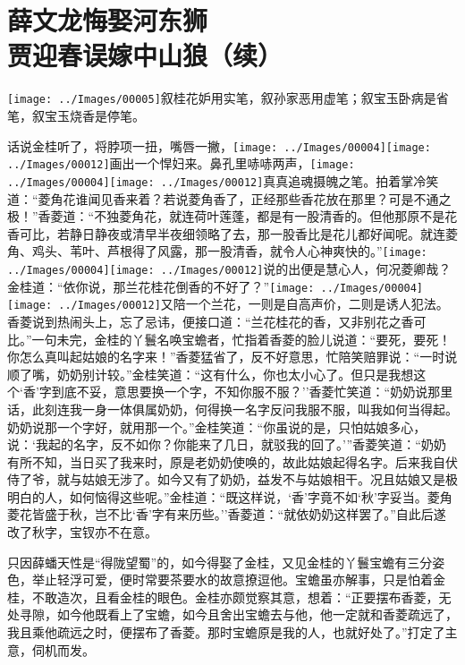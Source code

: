 
\chapter{薛文龙悔娶河东狮\\贾迎春误嫁中山狼（续）}

{\texttt{[image: ../Images/00005]}\kaishu 叙桂花妒用实笔，叙孙家恶用虚笔；叙宝玉卧病是省笔，叙宝玉烧香是停笔。}

话说金桂听了，将脖项一扭，嘴唇一撇，{\texttt{[image: ../Images/00004]}\texttt{[image: ../Images/00012]}\footnotesize \kaishu 画出一个悍妇来。}鼻孔里哧哧两声，{\texttt{[image: ../Images/00004]}\texttt{[image: ../Images/00012]}\footnotesize \kaishu 真真追魂摄魄之笔。}拍着掌冷笑道：``菱角花谁闻见香来着？若说菱角香了，正经那些香花放在那里？可是不通之极！''香菱道：``不独菱角花，就连荷叶莲蓬，都是有一股清香的。但他那原不是花香可比，若静日静夜或清早半夜细领略了去，那一股香比是花儿都好闻呢。就连菱角、鸡头、苇叶、芦根得了风露，那一股清香，就令人心神爽快的。''{\texttt{[image: ../Images/00004]}\texttt{[image: ../Images/00012]}\footnotesize \kaishu 说的出便是慧心人，何况菱卿哉？}金桂道：``依你说，那兰花桂花倒香的不好了？''{\texttt{[image: ../Images/00004]}\texttt{[image: ../Images/00012]}\footnotesize \kaishu 又陪一个兰花，一则是自高声价，二则是诱人犯法。}香菱说到热闹头上，忘了忌讳，便接口道：``兰花桂花的香，又非别花之香可比。''一句未完，金桂的丫鬟名唤宝蟾者，忙指着香菱的脸儿说道：``要死，要死！你怎么真叫起姑娘的名字来！''香菱猛省了，反不好意思，忙陪笑赔罪说：``一时说顺了嘴，奶奶别计较。''金桂笑道：``这有什么，你也太小心了。但只是我想这个`香'字到底不妥，意思要换一个字，不知你服不服？''香菱忙笑道：``奶奶说那里话，此刻连我一身一体俱属奶奶，何得换一名字反问我服不服，叫我如何当得起。奶奶说那一个字好，就用那一个。''金桂笑道：``你虽说的是，只怕姑娘多心，说：`我起的名字，反不如你？你能来了几日，就驳我的回了。'''香菱笑道：``奶奶有所不知，当日买了我来时，原是老奶奶使唤的，故此姑娘起得名字。后来我自伏侍了爷，就与姑娘无涉了。如今又有了奶奶，益发不与姑娘相干。况且姑娘又是极明白的人，如何恼得这些呢。''金桂道：``既这样说，`香'字竟不如`秋'字妥当。菱角菱花皆盛于秋，岂不比`香'字有来历些。''香菱道：``就依奶奶这样罢了。''自此后遂改了秋字，宝钗亦不在意。

只因薛蟠天性是``得陇望蜀''的，如今得娶了金桂，又见金桂的丫鬟宝蟾有三分姿色，举止轻浮可爱，便时常要茶要水的故意撩逗他。宝蟾虽亦解事，只是怕着金桂，不敢造次，且看金桂的眼色。金桂亦颇觉察其意，想着：``正要摆布香菱，无处寻隙，如今他既看上了宝蟾，如今且舍出宝蟾去与他，他一定就和香菱疏远了，我且乘他疏远之时，便摆布了香菱。那时宝蟾原是我的人，也就好处了。''打定了主意，伺机而发。

